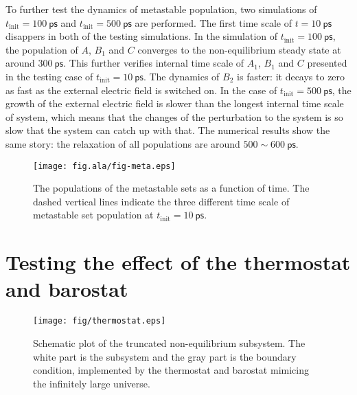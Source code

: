 \documentclass[a4paper,preprint,onecolumn]{revtex4-1}
\begin{document}
To further test the dynamics of metastable population, two simulations
of $t_{\textrm{init}} = 100~\textsf{ps}$ and $t_{\textrm{init}} =
500~\textsf{ps}$ are performed. The first time scale of $t =
10~\textsf{ps}$ disappers in both of the testing simulations. In the
simulation of $t_{\textrm{init}} = 100~\textsf{ps}$, the population of
$A$, $B_1$ and $C$ converges to the non-equilibrium steady state at
around $300~\textsf{ps}$. This further verifies internal time scale of
$A_1$, $B_1$ and $C$ presented in the testing case of
$t_{\textrm{init}} = 10~\textsf{ps}$.  The dynamics of $B_2$ is
faster: it decays to zero as fast as the external electric field is
switched on. In the case of $t_{\textrm{init}} = 500~\textsf{ps}$, the
growth of the external electric field is slower than the longest
internal time scale of system, which means that the changes of the
perturbation to the system is so slow that the system can catch up
with that. The numerical results show the same story: the relaxation
of all populations are around $500 \sim 600~\textsf{ps}$.
\\

\begin{figure}
  \centering
  \texttt{[image: fig.ala/fig-meta.eps]}
  \caption{The populations of the metastable sets as a function of time.
    The dashed vertical lines indicate the three different time scale of
  metastable set population at $t_{\textrm{init}} = 10~\textsf{ps}$.}
  \label{fig:tmp5}
\end{figure}

\section{Testing the effect of the thermostat and barostat}
\begin{figure}
  \centering
  \texttt{[image: fig/thermostat.eps]}
  \caption{Schematic plot of the truncated non-equilibrium subsystem.
    The white part is the subsystem and the gray part is the boundary
    condition, implemented by the thermostat and barostat mimicing
    the infinitely large universe.}
  \label{fig:tmp2}
\end{figure}




\end{document}
